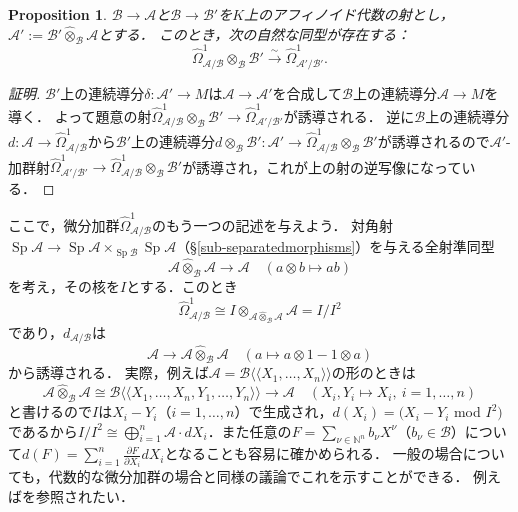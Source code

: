 \documentclass[a4paper,12pt, dvipdfmx]{jsbook}
\def\N{\mathbb{N}}
\def\Sp{\mathop{\mathrm{Sp}}\nolimits}
\def\dl{\langle\!\langle}
\def\dr{\rangle\!\rangle}
\theoremstyle{plain}
\newtheorem{prop}[thm]{\bfseries Proposition}
\theoremstyle{definition}
\begin{document}
\begin{prop}\label{prop-differentialmodule2}{\rm 
$\mathcal{B}\rightarrow\mathcal{A}$と$\mathcal{B}\rightarrow\mathcal{B}'$を$K$上のアフィノイド代数の射とし，$\mathcal{A}':=\mathcal{B}'\widehat{\otimes}_{\mathcal{B}}\mathcal{A}$とする．
このとき，次の自然な同型が存在する：
$$
\widehat{\Omega}^1_{\mathcal{A}/\mathcal{B}}\otimes_{\mathcal{B}}\mathcal{B}'\stackrel{\sim}{\longrightarrow}\widehat{\Omega}^1_{\mathcal{A}'/\mathcal{B}'}.
$$}
\end{prop}

\begin{proof}[証明]
$\mathcal{B}'$上の連続導分$\delta\colon\mathcal{A}'\rightarrow M$は$\mathcal{A}\rightarrow\mathcal{A}'$を合成して$\mathcal{B}$上の連続導分$\mathcal{A}\rightarrow M$を導く．
よって題意の射$\widehat{\Omega}^1_{\mathcal{A}/\mathcal{B}}\otimes_{\mathcal{B}}\mathcal{B}'\rightarrow\widehat{\Omega}^1_{\mathcal{A}'/\mathcal{B}'}$が誘導される．
逆に$\mathcal{B}$上の連続導分$d\colon\mathcal{A}\rightarrow\widehat{\Omega}^1_{\mathcal{A}/\mathcal{B}}$から$\mathcal{B}'$上の連続導分$d\otimes_{\mathcal{B}}\mathcal{B}'\colon\mathcal{A}'\rightarrow\widehat{\Omega}^1_{\mathcal{A}/\mathcal{B}}\otimes_{\mathcal{B}}\mathcal{B}'$が誘導されるので$\mathcal{A}'$-加群射$\widehat{\Omega}^1_{\mathcal{A}'/\mathcal{B}'}\rightarrow\widehat{\Omega}^1_{\mathcal{A}/\mathcal{B}}\otimes_{\mathcal{B}}\mathcal{B}'$が誘導され，これが上の射の逆写像になっている．
\end{proof}

ここで，微分加群$\widehat{\Omega}^1_{\mathcal{A}/\mathcal{B}}$のもう一つの記述を与えよう．
対角射$\Sp\mathcal{A}\rightarrow\Sp\mathcal{A}\times_{\Sp\mathcal{B}}\Sp\mathcal{A}$（\S\ref{sub-separatedmorphisms}）を与える全射準同型
$$
\mathcal{A}\widehat{\otimes}_{\mathcal{B}}\mathcal{A}\longrightarrow\mathcal{A}\quad (a\otimes b\longmapsto ab)
$$
を考え，その核を$I$とする．このとき
$$
\widehat{\Omega}^1_{\mathcal{A}/\mathcal{B}}\cong I\otimes_{\mathcal{A}\widehat{\otimes}_{\mathcal{B}}\mathcal{A}}\mathcal{A}=I/I^2
$$
であり，$d_{\mathcal{A}/\mathcal{B}}$は
$$
\mathcal{A}\longrightarrow\mathcal{A}\widehat{\otimes}_{\mathcal{B}}\mathcal{A}\quad (a\longmapsto a\otimes 1-1\otimes a)
$$
から誘導される．
実際，例えば$\mathcal{A}=\mathcal{B}\dl X_1,\ldots,X_n\dr$の形のときは
$$
\mathcal{A}\widehat{\otimes}_{\mathcal{B}}\mathcal{A}\cong\mathcal{B}\dl X_1,\ldots,X_n,Y_1,\ldots,Y_n\dr\longrightarrow\mathcal{A}\quad (X_i,Y_i\mapsto X_i,\ i=1,\ldots,n)
$$
と書けるので$I$は$X_i-Y_i$（$i=1,\ldots,n$）で生成され，$d(X_i)=(X_i-Y_i$ mod $I^2)$であるから$I/I^2\cong\bigoplus^{n}_{i=1}\mathcal{A}\cdot dX_i$．また任意の$F=\sum_{\nu\in\N^n}b_{\nu}X^{\nu}$（$b_{\nu}\in\mathcal{B}$）について$d(F)=\sum^n_{i=1}\frac{\partial F}{\partial X_i}dX_i$となることも容易に確かめられる．
一般の場合についても，代数的な微分加群の場合と同様の議論でこれを示すことができる．
例えば\cite[\S25]{Matsu}を参照されたい．
\end{document}

